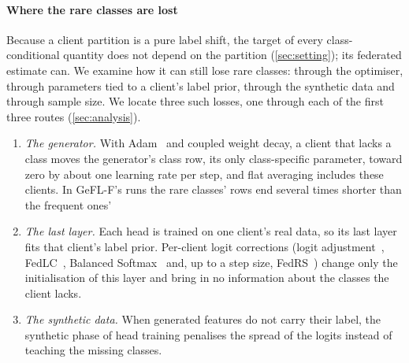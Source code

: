 \paragraph{Where the rare classes are lost} Because a client partition is a pure label shift, the target of every
class-conditional quantity does not depend on the partition (\cref{sec:setting}); its federated estimate can. We examine how it can still lose rare classes:
through the optimiser, through parameters tied to a client's label prior, through the synthetic data and through
sample size. We locate three such losses, one through each of the first three routes (\cref{sec:analysis}).
\begin{enumerate}
\item \emph{The generator.} With Adam~\cite{kingma2015adam} and coupled weight decay, a client that lacks a class moves
the generator's class row, its only class-specific parameter, toward zero by about one learning rate per step, and flat averaging includes these clients. In GeFL-F's runs the
rare classes' rows end several times shorter than the frequent ones'
\item \emph{The last layer.} Each head is trained on one client's real data, so its last layer fits that client's
label prior. Per-client logit corrections (logit adjustment~\cite{menon2021la}, FedLC~\cite{zhang2022fedlc},
Balanced Softmax~\cite{ren2020bsm} and, up to a step size, FedRS~\cite{li2021fedrs}) change only the initialisation
of this layer and bring in no information about the classes the client lacks.
\item \emph{The synthetic data.} When generated features do not carry their label, the synthetic phase of head
training penalises the spread of the logits instead of teaching the missing classes.
\end{enumerate}

